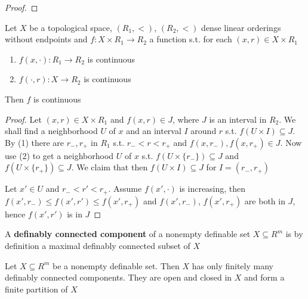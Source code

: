 \documentclass[11pt]{article}
\begin{document}
\begin{proof}

\end{proof}

\begin{lemma}[]
Let \(X\) be a topological space, \((R_1,<)\), \((R_2,<)\) dense linear orderings without
endpoints and \(f:X\times R_1\to R_2\) a function s.t. for each \((x,r)\in X\times R_1\)
\begin{enumerate}
\item \(f(x,\cdot):R_1\to R_2\) is continuous
\item \(f(\cdot,r):X\to R_2\) is continuous
\end{enumerate}
Then \(f\) is continuous
\end{lemma}

\begin{proof}
Let \((x,r)\in X\times R_1\) and \(f(x,r)\in J\), where \(J\) is an interval in \(R_2\). We shall find a
neighborhood \(U\) of \(x\) and an interval \(I\) around \(r\) s.t. \(f(U\times I)\subseteq J\). By (1) there
are \(r_-,r_+\) in \(R_1\) s.t. \(r_-<r<r_+\) and \(f(x,r_-),f(x,r_+)\in J\). Now use (2) to get a
neighborhood \(U\) of \(x\) s.t. \(f(U\times\{r_-\})\subseteq J\) and \(f(U\times\{r_+\})\subseteq J\). We claim that
then \(f(U\times I)\subseteq J\) for \(I=(r_-,r_+)\)

Let \(x'\in U\) and \(r_-<r'<r_+\). Assume \(f(x',\cdot)\) is increasing,
then \(f(x',r_-)\le f(x',r')\le f(x',r_+)\) and \(f(x',r_-)\), \(f(x',r_+)\) are both in \(J\),
hence \(f(x',r')\) is in \(J\)
\end{proof}

A \textbf{definably connected component} of a nonempty definable set \(X\subseteq R^m\) is by definition a maximal
definably connected subset of \(X\)

\begin{proposition}[]
Let \(X\subseteq R^m\) be a nonempty definable set. Then \(X\) has only finitely many definably connected
components. They are open and closed in \(X\) and form a finite partition of \(X\)
\end{proposition}
\end{document}
